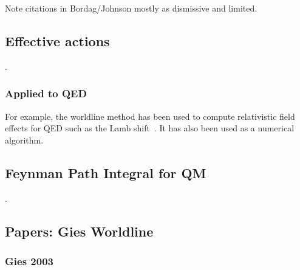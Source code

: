 Note citations in Bordag/Johnson mostly as dismissive and limited.  

\subsection{Effective actions}

\cite{McKeon1993, Strassler1992,Schubert2001}



\cite{Schubert2001}.  

\subsubsection{Applied to QED}

For example, the worldline method has been used to compute relativistic field effects for QED such
 as the Lamb shift~\cite{Schmidt1995}.  It has also been used as a numerical algorithm\cite{Mazur2014}.

\subsection{Feynman Path Integral for QM}

\cite{Feynman1948,Feynman1965,Brown2005}.

\subsection{Papers: Gies Worldline}

\subsubsection{Gies 2003}
\cite{Gies2003}

